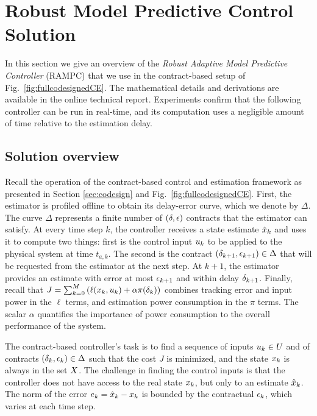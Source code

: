 \section{Robust Model Predictive Control Solution}
\label{robustMPC}

In this section we give an overview of the \emph{Robust Adaptive Model Predictive Controller} (RAMPC) that we use in the contract-based setup of Fig.~\ref{fig:fullcodesignedCE}.
The mathematical details and derivations are available in the online technical report.
Experiments confirm that the following controller can be run in real-time, and its computation uses a negligible amount of time relative to the estimation delay.

\subsection{Solution overview}
Recall the operation of the contract-based control and estimation framework as presented in Section \ref{sec:codesign} and Fig.~\ref{fig:fullcodesignedCE}.
First, the estimator is profiled offline to obtain its delay-error curve, which we denote by $\Delta$.
The curve $\Delta$ represents a finite number of $(\delta,\epsilon)$ contracts that the estimator can satisfy.
At every time step $k$, the controller receives a state estimate $\hat{x}_k$ and uses it to compute two things:
first is the control input $u_{k}$ to be applied to the physical system at time $t_{a,k}$.
The second is the contract $(\delta_{k+1}, \epsilon_{k+1}) \in \Delta$ that will be requested from the estimator at the next step.
At $k+1$, the estimator provides an estimate with error at most $\epsilon_{k+1}$ and within delay $\delta_{k+1}$.
Finally, recall that 
$J = \sum_{k=0}^{M}\left(\ell(x_k,u_k)+ \alpha \pi(\delta_k)\right)$ 
combines tracking error and input power in the $\ell$ terms, and estimation power consumption in the $\pi$ terms.
The scalar $\alpha$ quantifies the importance of power consumption to the overall performance of the system.

The contract-based controller's task is to find a sequence of inputs $u_k \in U$ and of contracts $(\delta_k, \epsilon_k) \in \Delta$ such that the cost $J$ is minimized, and the state $x_k$ is always in the set $X$.
The challenge in finding the control inputs is that the controller does not have access to the real state $x_k$, but only to an estimate $\hat{x}_k$.
The norm of the error $e_k = \hat{x}_k - x_k$ is bounded by the contractual $\epsilon_k$, which varies at each time step.

